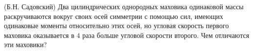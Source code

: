 (Б.Н. Садовский)
Два цилиндрических однородных маховика одинаковой массы раскручиваются
вокруг своих осей симметрии с помощью сил, имеющих одинаковые
моменты относительно этих осей, но угловая скорость первого маховика
оказывается в $4$ раза больше угловой скорости второго. Чем отличаются
эти маховики?
